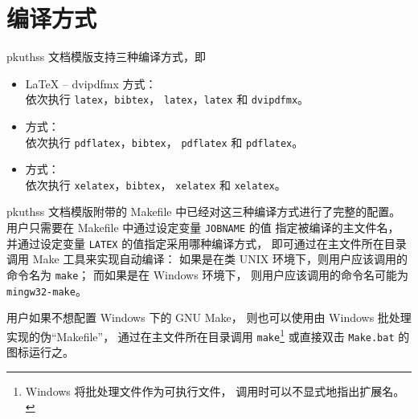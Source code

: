 	\section{编译方式}\label{sec:compile}

	pkuthss 文档模版支持三种编译方式，即
	\begin{itemize}
		\item \LaTeX{} -- dvipdfmx 方式：\\
			依次执行 \verb|latex|，\verb|bibtex|，%
			\verb|latex|，\verb|latex| 和 \verb|dvipdfmx|。
		\item {} 方式：\\
			依次执行 \verb|pdflatex|，\verb|bibtex|，%
			\verb|pdflatex| 和 \verb|pdflatex|。
		\item {} 方式：\\
			依次执行 \verb|xelatex|，\verb|bibtex|，%
			\verb|xelatex| 和 \verb|xelatex|。\\
	\end{itemize}

	pkuthss 文档模版附带的 Makefile 中已经对这三种编译方式进行了完整的配置。
	用户只需要在 Makefile 中通过设定变量 \verb|JOBNAME| 的值%
	指定被编译的主文件名，
	并通过设定变量 \verb|LATEX| 的值指定采用哪种编译方式，
	即可通过在主文件所在目录调用 Make 工具来实现自动编译：
	如果是在类 UNIX 环境下，则用户应该调用的命令名为 \verb|make|；
	而如果是在 Windows 环境下，
	则用户应该调用的命令名可能为 \verb|mingw32-make|。

	用户如果不想配置 Windows 下的 GNU Make，
	则也可以使用由 Windows 批处理实现的伪“Makefile”，
	通过在主文件所在目录调用 \verb|make|\footnote{%
		Windows 将批处理文件作为可执行文件，
		调用时可以不显式地指出扩展名。%
	} 或直接双击 \verb|Make.bat| 的图标运行之。

